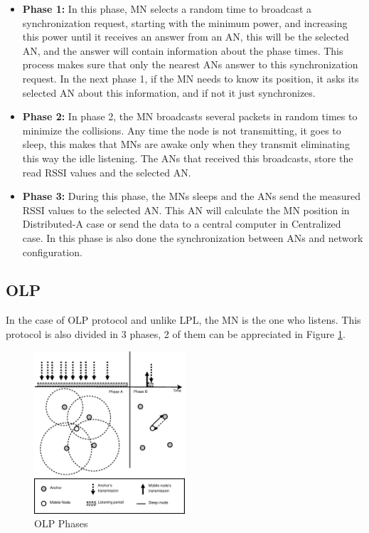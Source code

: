 \begin{itemize}
 \item \textbf{Phase 1:} In this phase, \ac{MN} selects a random time to broadcast a synchronization request, starting with the minimum power,
and increasing this power until it receives an answer from an \ac{AN}, this will be the selected \ac{AN}, and the answer will contain information
about the phase times. This process makes sure that only the nearest \acp{AN} answer to this synchronization request. In the next phase 1, if 
the \ac{MN} needs to know its position, it asks its selected \ac{AN} about this information, and if not it just synchronizes.
 \item \textbf{Phase 2:} In phase 2, the \ac{MN} broadcasts several packets in random times to minimize the collisions. Any time the node is not
transmitting, it goes to sleep, this makes that \acp{MN} are awake only when they transmit eliminating this way the idle listening. The \acp{AN} that
received this broadcasts, store the read \ac{RSSI} values and the selected \ac{AN}.
 \item \textbf{Phase 3:} During this phase, the \acp{MN} sleeps and the \acp{AN} send the measured \ac{RSSI} values to the selected \ac{AN}. 
This \ac{AN} will calculate the \ac{MN} position in Distributed-A case or send the data to a central computer in Centralized case. In this phase is
also done the synchronization between \acp{AN} and network configuration.


\end{itemize}


\subsection{\acl{OLP}}

In the case of \ac{OLP} protocol and unlike \ac{LPL}, the \ac{MN} is the one who listens. This protocol is also divided in 3 phases, 2 of 
them can be appreciated in Figure \ref{fig:OLP}.

\begin{figure}[ht]
 \begin{center}
  \includegraphics[width=0.5\textwidth]{OLP.eps}
 \end{center}
 \caption{OLP Phases \cite{LPLandOLP}}
 \label{fig:OLP}
\end{figure}

